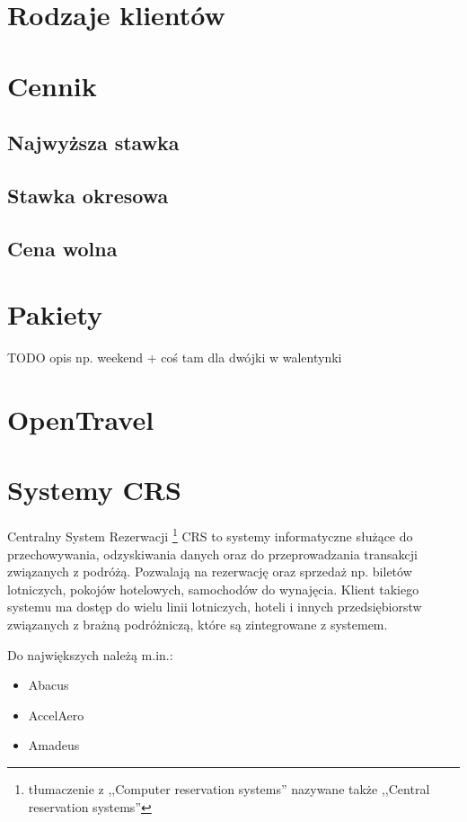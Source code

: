\documentclass[a4paper,onecolumn,oneside,11pt,wide,floatssmall]{mwrep}
\theoremstyle{definition}
\theoremstyle{plain}%
\theoremstyle{remark}
\begin{document}
\section{Rodzaje klientów}

\section{Cennik}

\subsection{Najwyższa stawka}

\subsection{Stawka okresowa}

\subsection{Cena wolna}

\section{Pakiety}

TODO opis np. weekend + coś tam dla dwójki w walentynki

\section{OpenTravel}

\section{Systemy CRS}
\label{system-crs}
Centralny System Rezerwacji \footnote{tłumaczenie z ,,Computer reservation 
systems'' nazywane także ,,Central reservation systems''} CRS to systemy 
informatyczne służące do przechowywania, odzyskiwania danych oraz do 
przeprowadzania transakcji związanych z podróżą. Pozwalają na rezerwację 
oraz sprzedaż np. biletów lotniczych, pokojów hotelowych, samochodów do 
wynajęcia. Klient takiego systemu ma dostęp do wielu linii lotniczych, 
hoteli i innych przedsiębiorstw związanych z brażną podróżniczą, które są 
zintegrowane z systemem.

Do największych należą m.in.:
\begin{itemize}
\item Abacus
\item AccelAero
\item Amadeus
\end{itemize}
\end{document}
